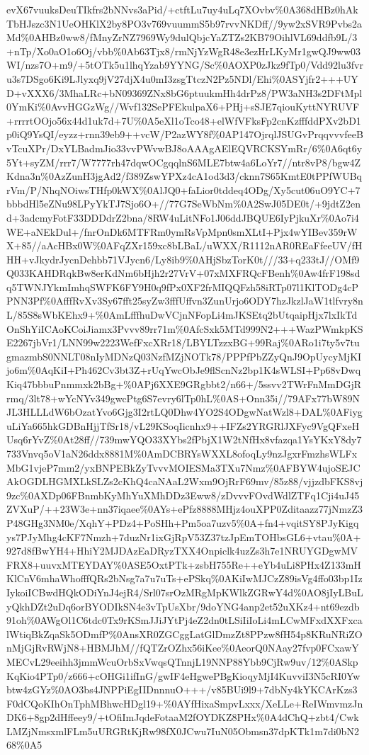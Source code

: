 \documentclass[]{article}
\begin{document}
evX67vuuksDeuTIkfrs2bNNvs3aPid/+ctftLu7uy4uLq7XOvbv\%0A368dHBz0hAkTbHJszc3N1UeOHKlX2by8PO3v769vuummS5b97rvvNKDff//9yw2xSVR9Pvbs2aMd\%0AHBz0ww8/fMnyZrNZ7969Wy9dulQbjcYaZTZs2KB79OihlVL69ddfb9L/3+nTp/Xo0aO1o6Oj/vbb\%0Ab63Tjx8/rmNjYzWgR48e3ezHrLKyMr1gwQJ9ww03WI/nzs7O+m9/+5tOTk5u1lhqYzab9YYNG/Sc\%0AOXP0zJkz9fTp0/Vdd92lu3fvru3s7DSgo6Ki9LJlyxq9jV27djX4u0mI3zsgTtczN2Pz5NDl/Ehi\%0ASYjfr2+++UYD+vXXX6/3MhaLRc+bN09369ZNx8bG6ptuukmHh4drPz8/PW3aNH3s2DFtMpl0YmKi\%0AvvHGGzWg//Wvf132SePFEkulpaX6+PHj+sSJE7qiouKyttNYRUVF+rrrrtOOjo56x44d1uk7d+7U\%0A5eXl1oTco48+elWfVFksFp2cnKzfffddPXv2bD1p0iQ9YsQI/eyzz+rnn39eb9++vcW/P2azWY8f\%0AP147OjrqlJSUGvPrqqvvvfeeBvTcuXPr/DxYLBadmJio33vvPWvwBJ8oAAAgAElEQVRCKSYmRr/6\%0A6qt6y5Yt+syZM/rrr7/W7777rh47dqwOCgqqlnS6MLE7btw4a6LoYr7//ntr8vP8/bgw4ZKdna3n\%0AzZunH3jgAd2/f389ZswYPXz4cA1od3d3/cknn7S65KmtE0tPPfWUBqrVm/P/NhqNOiwsTHfp0kWX\%0AlJQ0+faLior0tddeq4ODg/Xy5cut06uO9YC+7bbbdHl5eZNu98LPyYkTJ7Sjo6O+//77G7SeWbNm\%0A2SwJ05DE0t/+9jdtZ2end+3adcmyFotF33DDDdrZ2bna/8RW4uLitNFo1J06ddJBQUE6IyPjkuXr\%0Ao7i4WE+aNEkDul+/fnrOnDk6MTFRm0ymRsVpMpn0smXLtI+Pjx4wYIBev359rWX+85//aAcHBx0W\%0AFqZXr159xc8bLBaL/uWXX/R1112nAR0REaFfeeUV/fHHH+vJkydrJycnDehbb71VJycn6/Ly8ib9\%0AHjSbzTorK0t///33+q233tJ//OMf9Q033KAHDRqkBw8erKdNm6bHjh2r27VrV+07xMXFRQcFBenh\%0Aw4frF198sdq5TWNJYkmImhqSWFK6FY9H0q9fPx0XF2frMIQQFzh58iRTp07l1KlTODg4cPPNN3Pf\%0AfffRvXv3Sy67fft25syZw3fffUffvn3ZunUrjo6ODY7hzJkzlJaW1tlfvry8nL/85S8sWbKEhx9+\%0AmLfffhuDwVCjnNFopLi4mJKSEtq2bUtqaipHjx7lxIkTdOnShYiICAoKCoiJiamx3Pvvv89rr71m\%0AfcSxk5MTd999N2+++WazPWmkpKSE2267jbVr1/LNN99w2223WefFxcXRr18/LBYLTzzxBG+99Raj\%0ARo1i7ty5v7tugmazmbS0NNLT08nIyMDNzQ03NzfMZjNOTk78/PPPfPbZZyQnJ9OpUycyMjKIjo6m\%0AqKiI+Ph462Cv3bt3Z+rUqYwcObJe9flScnNz2bp1K4sWLSI+Pp68vDwqKiq47bbbuPnmmxk2bBg+\%0APj6XXE9GRgbbt2/n66+/5ssvv2TWrFnMmDGjRrmq/3lt78+wYcNYv349gwcPtg6S7evry6lTp0hL\%0AS+Onn35i//79AFx77bW89NJL3HLLLdW6bOzatYvo6Gjg3I2rtLQ0Dhw4YO2S4ODgwNatWzl8+DAL\%0AFiyguLiYa665hkGDBnHjjTfSr18/vL29KSoqIicnhx9++IFZs2YRGRlJXFyc9VgQFxeHUsq6rYvZ\%0At28ff//739mwYQO33XYbs2fPbjX1W2tNfHx8vfazqa1YsYKxY8dy7733Vnvq5oV1aN26ddx8881M\%0AmDCBRYsWXXL8ofoqLy9nzJgxrFmzhsWLFxMbG1vjeP7mm2/yxBNPEBkZyTvvvMOIESMa3TXu7Nmz\%0AFBYW4ujoSEJCAkOGDLHGMXLkSLZs2cKhQ4caNAaL2Wxm9OjRrF69mv/85z88/vjjzdbFKS8vj9zc\%0AXDp06FBnmbKyMhYuXMhDDz3Eww8/zDvvvFOvdWdlZTFq1Cji4uJ45ZVXuP/++23W3e+nn37iqaee\%0AYs+ePfz8888MHjz4ouXPP0Zditaazz77jNmzZ3P48GHg3NM0e/XqhY+PDz4+PoSHh+Pm5oa7uzv5\%0A+fn4+vqitSY8PJyKigqys7PJyMhg4cKF7Nmzh+7duzNr1ixGjRpV53Z37tzJpEmTOHbsGL6+vtau\%0A+927d8fBwYH4+HhiY2MJDAzEaDRyzTXX4Onpiclk4uzZs3h7e1NRUYGDgwMVFRX8+uuvxMTEYDAY\%0ASE5OxtPTk+zsbH755Re++eYb4uLi8PHx4Z133mHKlCnV6mhaWhofffQRs2bNsg7a7u7uTs+ePSkq\%0AKiIwMJCzZ89isVg4ffo03bp1IzIykoiICBwdHQkODiYnJ4ejR4/Srl07srOzMRgMpKWlkZGRwY4d\%0AO8jIyLBuLyQkhDZt2uDq6orBYODIkSN4e3vTpUsXbr/9doYNG4anp2et52uXKz4+nt69ezdb91oh\%0AWgOl1C6tdc0Tx9rKSmJJiJYtPj4eZ2dn0tLSiIiIoLi4mLCwMFxdXXFxcalWtiqBkZqaSk5ODmfP\%0AnsXR0ZGCggLatGlDmzZt8PPzw8fH54p8KRuNRiZOnMjGjRvRWjN8+HBMJhM//fQTZrOZhx56iKee\%0AeorQ0NAay27fvp0FCxawYMECvL29eeihh3jmmWcuOrbSxVwqsQTnnjL19NNP88Ybb9CjRw9uv/12\%0ASkpKqKio4PTp0/z666+cOHGi1ifInG/gwIF4eHgwePBgKioqyMjI4KuvviI3N5cRI0Ywbtw4zGYz\%0AO3bs4JNPPiEgIIDnnnuO+++/v85BUi9l9+7dbNy4kYKCArKzs3F0dCQoKIhOnTphMBhwcHDgl19+\%0AYfHixaSmpvLxxx/XeLLe+ReIWmvmzJnDK6+8gp2dHffeey9/+tOfiImJqdeFotaaM2fOYDKZ8PHx\%0A4dChQ+zbt4/CwkLMZjNmsxmlFLm5uURGRtKjRw98fX0JCwu7IuN05Obmsn37dpKTk1m7di0bN268\%0A5
\end{document}
